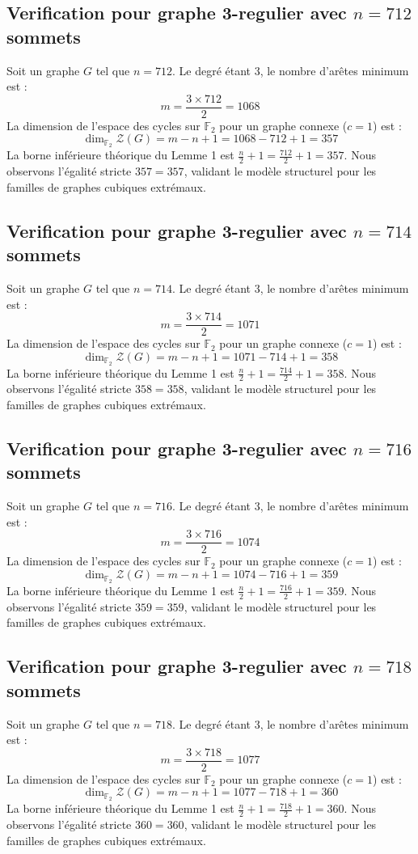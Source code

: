 \documentclass[11pt,a4paper]{article}
\begin{document}
\subsection{Verification pour graphe 3-regulier avec $n=712$ sommets}
Soit un graphe $G$ tel que $n = 712$. Le degré étant 3, le nombre d'arêtes minimum est :
$$ m = \frac{3 \times 712}{2} = 1068 $$
La dimension de l'espace des cycles sur $\mathbb{F}_2$ pour un graphe connexe ($c=1$) est :
$$ \dim_{\mathbb{F}_2} \mathcal{Z}(G) = m - n + 1 = 1068 - 712 + 1 = 357 $$
La borne inférieure théorique du Lemme 1 est $\frac{n}{2} + 1 = \frac{712}{2} + 1 = 357$.
Nous observons l'égalité stricte $357 = 357$, validant le modèle structurel pour les familles de graphes cubiques extrémaux.

\subsection{Verification pour graphe 3-regulier avec $n=714$ sommets}
Soit un graphe $G$ tel que $n = 714$. Le degré étant 3, le nombre d'arêtes minimum est :
$$ m = \frac{3 \times 714}{2} = 1071 $$
La dimension de l'espace des cycles sur $\mathbb{F}_2$ pour un graphe connexe ($c=1$) est :
$$ \dim_{\mathbb{F}_2} \mathcal{Z}(G) = m - n + 1 = 1071 - 714 + 1 = 358 $$
La borne inférieure théorique du Lemme 1 est $\frac{n}{2} + 1 = \frac{714}{2} + 1 = 358$.
Nous observons l'égalité stricte $358 = 358$, validant le modèle structurel pour les familles de graphes cubiques extrémaux.

\subsection{Verification pour graphe 3-regulier avec $n=716$ sommets}
Soit un graphe $G$ tel que $n = 716$. Le degré étant 3, le nombre d'arêtes minimum est :
$$ m = \frac{3 \times 716}{2} = 1074 $$
La dimension de l'espace des cycles sur $\mathbb{F}_2$ pour un graphe connexe ($c=1$) est :
$$ \dim_{\mathbb{F}_2} \mathcal{Z}(G) = m - n + 1 = 1074 - 716 + 1 = 359 $$
La borne inférieure théorique du Lemme 1 est $\frac{n}{2} + 1 = \frac{716}{2} + 1 = 359$.
Nous observons l'égalité stricte $359 = 359$, validant le modèle structurel pour les familles de graphes cubiques extrémaux.

\subsection{Verification pour graphe 3-regulier avec $n=718$ sommets}
Soit un graphe $G$ tel que $n = 718$. Le degré étant 3, le nombre d'arêtes minimum est :
$$ m = \frac{3 \times 718}{2} = 1077 $$
La dimension de l'espace des cycles sur $\mathbb{F}_2$ pour un graphe connexe ($c=1$) est :
$$ \dim_{\mathbb{F}_2} \mathcal{Z}(G) = m - n + 1 = 1077 - 718 + 1 = 360 $$
La borne inférieure théorique du Lemme 1 est $\frac{n}{2} + 1 = \frac{718}{2} + 1 = 360$.
Nous observons l'égalité stricte $360 = 360$, validant le modèle structurel pour les familles de graphes cubiques extrémaux.
\end{document}

